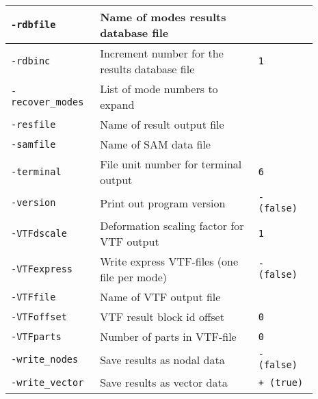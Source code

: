 {\begin{tabular}{|>{\raggedright} p{0.23\linewidth}| p{0.48\linewidth}| p{0.18\linewidth}|}
  \hline
  \texttt{-rdbfile} &   Name of modes results database file  &  \\
  \hline
  \texttt{-rdbinc} &   Increment number for the results database file  & \texttt{1}   \\
  \hline
  \texttt{-recover\_modes} &   List of mode numbers to expand  &  \\
  \hline
  \texttt{-resfile} &   Name of result output file  &  \\
  \hline
  \texttt{-samfile} &   Name of SAM data file  &  \\
  \hline
  \texttt{-terminal} &   File unit number for terminal output  & \texttt{6}   \\
  \hline
  \texttt{-version} &   Print out program version  & \texttt{- (false)}   \\
  \hline
  \texttt{-VTFdscale} &   Deformation scaling factor for VTF output  & \texttt{1}   \\
  \hline
  \texttt{-VTFexpress} &   Write express VTF-files (one file per mode)  & \texttt{- (false)}   \\
  \hline
  \texttt{-VTFfile} &   Name of VTF output file  &  \\
  \hline
  \texttt{-VTFoffset} &   VTF result block id offset  & \texttt{0}   \\
  \hline
  \texttt{-VTFparts} &   Number of parts in VTF-file  & \texttt{0}   \\
  \hline
  \texttt{-write\_nodes} &   Save results as nodal data  & \texttt{- (false)}   \\
  \hline
  \texttt{-write\_vector} &   Save results as vector data  & \texttt{+ (true)}   \\
  \hline
\end{tabular}}

\clearpage



